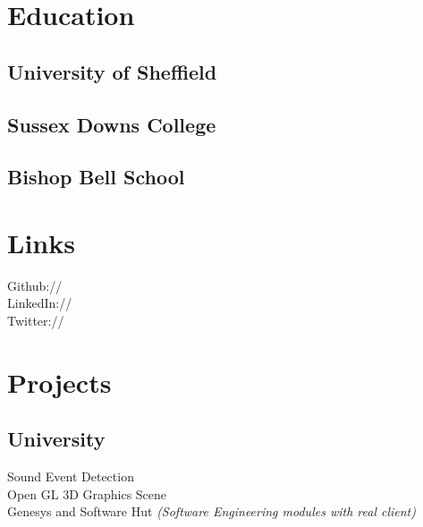 \documentclass[]{deedy-resume-openfont}
\begin{document}
\begin{minipage}[t]{0.33\textwidth}


\section{Education}

\subsection{University of Sheffield}
\sectionsep

\subsection{Sussex Downs College}
\sectionsep

\subsection{Bishop Bell School}
\sectionsep


\section{Links}
Github:// \href{https://github.com/jackdeadman}{} \\
LinkedIn://  \href{https://www.linkedin.com/in/jack-deadman-19101297}{} \\
Twitter://  \href{https://twitter.com/jackdeadman96}{} \\
\sectionsep


\section{Projects}
\subsection{University}
Sound Event Detection\\
Open GL 3D Graphics Scene\\
Genesys and Software Hut \textit{(Software Engineering modules with real client)}
\sectionsep

\end{minipage}
\end{document}
